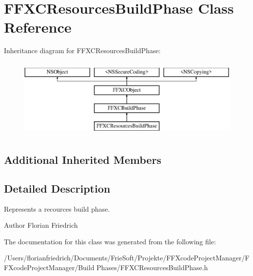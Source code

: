 \hypertarget{interface_f_f_x_c_resources_build_phase}{\section{F\-F\-X\-C\-Resources\-Build\-Phase Class Reference}
\label{interface_f_f_x_c_resources_build_phase}
}
Inheritance diagram for F\-F\-X\-C\-Resources\-Build\-Phase\-:\begin{figure}[H]
\begin{center}
\leavevmode
\includegraphics[height=4.000000cm]{interface_f_f_x_c_resources_build_phase}
\end{center}
\end{figure}
\subsection*{Additional Inherited Members}


\subsection{Detailed Description}
Represents a recources build phase. \begin{DoxyAuthor}{Author}
Florian Friedrich 
\end{DoxyAuthor}


The documentation for this class was generated from the following file\-:\begin{DoxyCompactItemize}
\item 
/\-Users/florianfriedrich/\-Documents/\-Frie\-Soft/\-Projekte/\-F\-F\-Xcode\-Project\-Manager/\-F\-F\-Xcode\-Project\-Manager/\-Build Phases/F\-F\-X\-C\-Resources\-Build\-Phase.\-h\end{DoxyCompactItemize}
